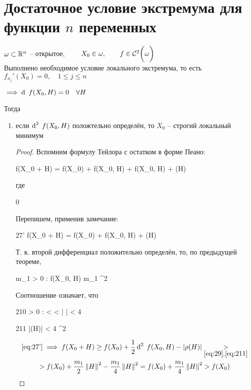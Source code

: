 \section{Достаточное условие экстремума для функции \texorpdfstring{$ n $}n переменных}

\begin{theorem}
	$ \omega \sub \R^n $ -- открытое, $ \qquad X_0 \in \omega, \qquad f \in \Cont[2]\omega $ \\
	Выполнено необходимое условие локального экстремума, то есть $ f_{x_j}'(X_0) = 0, \quad 1 \le j \le n $
	\begin{remark}
		$ \implies \di f(X_0, H) = 0 \quad \forall H $
	\end{remark}
	Тогда
	\begin{enumerate}
		\item\label{th:4} если $ \di[2] f(X_0, H) $ положтельно определён, то $ X_0 $ -- строгий локальный минимум
		\begin{proof}
			Вспомним формулу Тейлора с остатком в форме Пеано:
			\begin{equ}{27}
				f(X_0 + H) = f(X_0) + \di f(X_0, H) + \half \di[2] f(X_0, H) + \rho(H)
			\end{equ}
			где
			\begin{equ}{28}
				 \underarr{H \to \On} 0
			\end{equ}
			Перепишем, применив замечание:
			\begin{equ}{27'}
				f(X_0 + H) = f(X_0) + \half \di[2] f(X_0, H) + \rho(H)
			\end{equ}
			Т. к. второй дифференциал положительно определён, то, по предыдущей теореме,
			\begin{equ}{29}
				\exist m_1 > 0 : \di[2] f(X_0, H) \ge m_1 \norm{H}^2
			\end{equ}
			Соотношение  означает, что
			\begin{equ}{210}
				\exist \delta > 0 :  <  < \delta \quad \bigg|  \bigg| < \frac{m_1}4
			\end{equ}
			\begin{equ}{211}
				 \iff |\rho(H)| < 4 \norm{H}^2
			\end{equ}
			\begin{multline*}
				\eref{27'} \implies f(X_0 + H) \ge f(X_0) + \half \di[2] f(X_0, H) - |\rho(H)| \underset{\eref{29}, \eref{211}}> \\
				> f(X_0) + \half[m_1]^2 - 4^2 = f(X_0) + \frac{m_1}4\norm{H}^2 > f(X_0)

\end{multline*}
\end{proof}
\end{enumerate}
\end{theorem}
